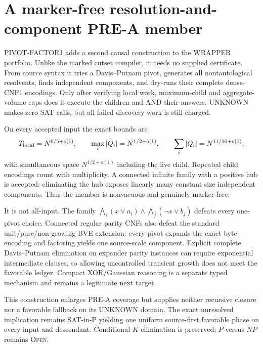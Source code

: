 \section{A marker-free resolution-and-component PRE-A member}

\textsc{PIVOT-FACTOR1} adds a second causal construction to the WRAPPER
portfolio.  Unlike the marked cutset compiler, it needs no supplied
certificate.  From source syntax it tries a Davis--Putnam pivot, generates all
nontautological resolvents, finds independent components, and dry-runs their
complete dense-CNF1 encodings.  Only after verifying local work, maximum-child
and aggregate-volume caps does it execute the children and AND their answers.
UNKNOWN makes zero SAT calls, but all failed discovery work is still charged.

On every accepted input the exact bounds are
\[
 T_{\rm local}=N^{6/5+o(1)},\qquad
 \max_i|Q_i|=N^{1/2+o(1)},\qquad
 \sum_i|Q_i|=N^{11/10+o(1)},
\]
with simultaneous space $N^{1/2+o(1)}$ including the live child.  Repeated
child encodings count with multiplicity.  A connected infinite family with a
positive hub is accepted: eliminating the hub exposes linearly many constant
size independent components.  Thus the member is nonvacuous and genuinely
marker-free.

It is not all-input.  The family
$\bigwedge_i(x\vee a_i)\wedge\bigwedge_j(\neg x\vee b_j)$ defeats every
one-pivot choice.  Connected regular parity CNFs also defeat the standard
unit/pure/non-growing-BVE extension: every pivot expands the exact byte
encoding and factoring yields one source-scale component.  Explicit complete
Davis--Putnam elimination on expander parity instances can require
exponential intermediate clauses, so allowing uncontrolled transient growth
does not meet the favorable ledger.  Compact XOR/Gaussian reasoning is a
separate typed mechanism and remains a legitimate next target.

This construction enlarges PRE-A coverage but supplies neither recursive
closure nor a favorable fallback on its UNKNOWN domain.  The exact unresolved
implication remains SAT-in-P yielding one uniform source-first favorable
phase on every input and descendant.  Conditional $K$ elimination is
preserved; $P$ versus $NP$ remains \textsc{Open}.

